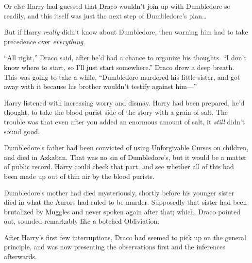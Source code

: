 Or else Harry had guessed that Draco wouldn’t join up with Dumbledore so readily, and this itself was just the next step of Dumbledore’s plan…

But if Harry \emph{really} didn’t know about Dumbledore, then warning him had to take precedence over \emph{everything}.

“All right,” Draco said, after he’d had a chance to organize his thoughts. “I don’t know where to start, so I’ll just start somewhere.” Draco drew a deep breath. This was going to take a while. “Dumbledore murdered his little sister, and got away with it because his brother wouldn’t testify against him—”

\later

Harry listened with increasing worry and dismay. Harry had been prepared, he’d thought, to take the blood purist side of the story with a grain of salt. The trouble was that even after you added an enormous amount of salt, it \emph{still} didn’t sound good.

Dumbledore’s father had been convicted of using Unforgivable Curses on children, and died in Azkaban. That was no sin of Dumbledore’s, but it would be a matter of public record. Harry could check that part, and see whether all of this had been made up out of thin air by the blood purists.

Dumbledore’s mother had died mysteriously, shortly before his younger sister died in what the Aurors had ruled to be murder. Supposedly that sister had been brutalized by Muggles and never spoken again after that; which, Draco pointed out, sounded remarkably like a botched Obliviation.

After Harry’s first few interruptions, Draco had seemed to pick up on the general principle, and was now presenting the observations first and the inferences afterwards.

